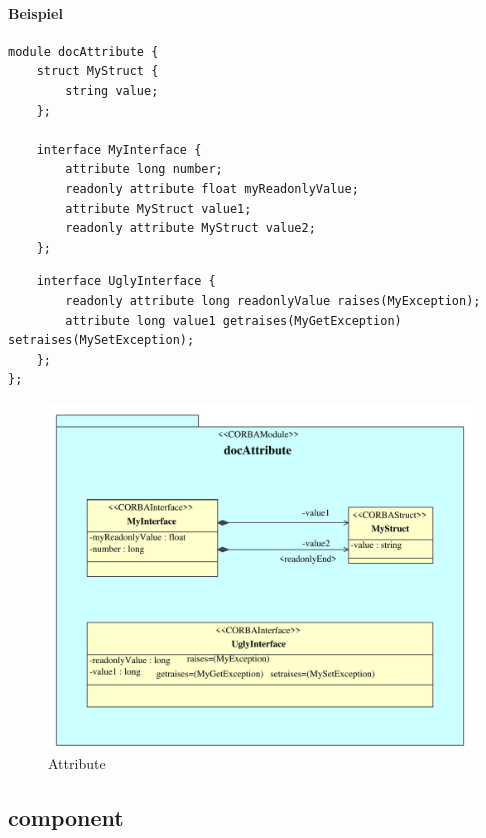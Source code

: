 \documentclass [a4paper,10pt] {scrartcl}
\begin{document}
\paragraph{Beispiel}
\begin{verbatim}
module docAttribute {
    struct MyStruct {
        string value;
    };

    interface MyInterface {
        attribute long number;
        readonly attribute float myReadonlyValue;
        attribute MyStruct value1;
        readonly attribute MyStruct value2;
    };
\end{verbatim}
\newpage
\begin{verbatim}
    interface UglyInterface {
        readonly attribute long readonlyValue raises(MyException);
        attribute long value1 getraises(MyGetException) setraises(MySetException);
    };
};
\end{verbatim}
\begin{figure}[!h]
\centerline{\includegraphics[width=\linewidth]{docAttribute}}
\caption{Attribute}
\label{fig:attribute}
\end{figure}

\cleardoublepage
\subsection{component}
\end{document}
